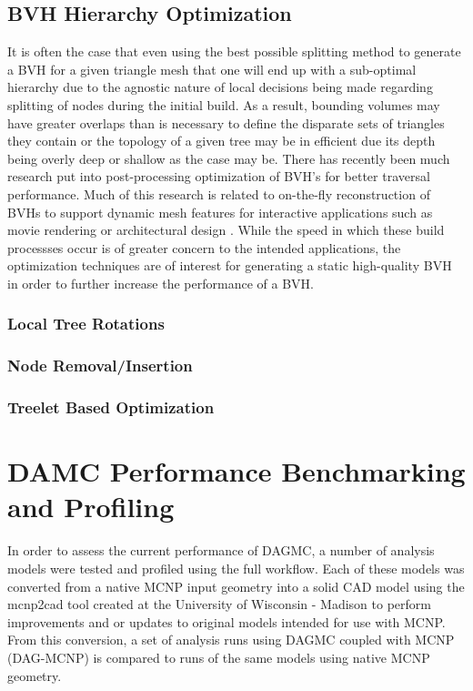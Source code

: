 \documentclass[12pt, a4paper]{article}
\begin{document}
\subsection{BVH Hierarchy Optimization}%

It is often the case that even using the best possible splitting method to generate a BVH for a given triangle mesh that one will end up with a sub-optimal hierarchy due to the agnostic nature of local decisions being made regarding splitting of nodes during the initial build. As a result, bounding volumes may have greater overlaps than is necessary to define the disparate sets of triangles they contain or the topology of a given tree may be in efficient due its depth being overly deep or shallow as the case may be. There has recently been much research put into post-processing optimization of BVH's for better traversal performance. Much of this research is related to on-the-fly reconstruction of BVHs to support dynamic mesh features for interactive applications such as movie rendering or architectural design \cite{karras_2013}. While the speed in which these build processses occur is of greater concern to the intended applications, the optimization techniques are of interest for generating a static high-quality BVH in order to further increase the performance of a BVH.

\subsubsection{Local Tree Rotations}%

\subsubsection{Node Removal/Insertion}%

\subsubsection{Treelet Based Optimization}%

\section{DAMC Performance Benchmarking and Profiling}%
\label{perf_benchmark}

In order to assess the current performance of DAGMC, a number of analysis models were tested and profiled using the full workflow. Each of these models was converted from a native MCNP input geometry into a solid CAD model using the mcnp2cad tool created at the University of Wisconsin - Madison to perform improvements and or updates to original models intended for use with MCNP. From this conversion, a set of analysis runs using DAGMC coupled with MCNP (DAG-MCNP) is compared to runs of the same models using native MCNP geometry.
\end{document}
